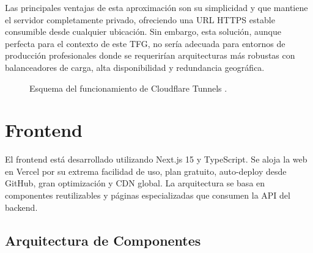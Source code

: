 Las principales ventajas de esta aproximación son su simplicidad y que mantiene el servidor completamente privado, ofreciendo una URL HTTPS estable consumible desde cualquier ubicación. Sin embargo, esta solución, aunque perfecta para el contexto de este TFG, no sería adecuada para entornos de producción profesionales donde se requerirían arquitecturas más robustas con balanceadores de carga, alta disponibilidad y redundancia geográfica.  


\begin{figure}[H]
  \centering
  \caption{Esquema del funcionamiento de Cloudflare Tunnels \cite{cloudflaretunnels}.}
  \label{fig:cloudflared}
\end{figure}


\newpage
\section{Frontend}


El frontend está desarrollado utilizando Next.js 15 y TypeScript. Se aloja la web en Vercel por su extrema facilidad de uso, plan gratuito, auto-deploy desde GitHub, gran optimización y CDN global. La arquitectura se basa en componentes reutilizables y páginas especializadas que consumen la API del backend.



\subsection{Arquitectura de Componentes}

